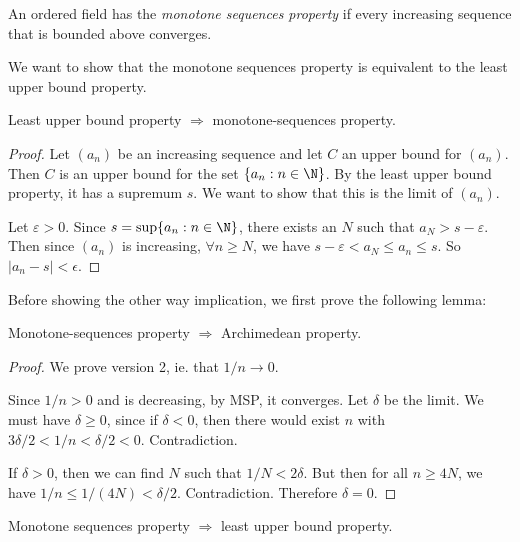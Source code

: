 \documentclass[a4paper]{article}
\begin{document}
\begin{defi}
  An ordered field has the \emph{monotone sequences property} if every increasing sequence that is bounded above converges.
\end{defi}

We want to show that the monotone sequences property is equivalent to the least upper bound property.
\begin{lemma}
  Least upper bound property $\Rightarrow$ monotone-sequences property.
\end{lemma}

\begin{proof}
  Let $(a_n)$ be an increasing sequence and let $C$ an upper bound for $(a_n)$. Then $C$ is an upper bound for the set $\{a_n: n \in \N\}$. By the least upper bound property, it has a supremum $s$. We want to show that this is the limit of $(a_n)$.

  Let $\varepsilon > 0$. Since $s = \sup \{a_n: n\in \N\}$, there exists an $N$ such that $a_N > s - \varepsilon$. Then since $(a_n)$ is increasing, $\forall n \geq N$, we have $s - \varepsilon < a_N \leq a_n \leq s$. So $|a_n - s| < \epsilon$.
\end{proof}

Before showing the other way implication, we first prove the following lemma:
\begin{lemma}
  Monotone-sequences property $\Rightarrow$ Archimedean property.
\end{lemma}

\begin{proof}
  We prove version 2, ie. that $1/n \to 0$.

  Since $1/n > 0$ and is decreasing, by MSP, it converges. Let $\delta$ be the limit. We must have $\delta \geq 0$, since if $\delta < 0$, then there would exist $n$ with $3\delta/2 < 1/n < \delta/2 < 0$. Contradiction.

  If $\delta > 0$, then we can find $N$ such that $1/N < 2\delta$. But then for all $n \geq 4N$, we have $1/n \leq 1/(4N) < \delta/2$. Contradiction. Therefore $\delta = 0$.
\end{proof}

\begin{lemma}
  Monotone sequences property $\Rightarrow$ least upper bound property.
\end{lemma}
\end{document}
